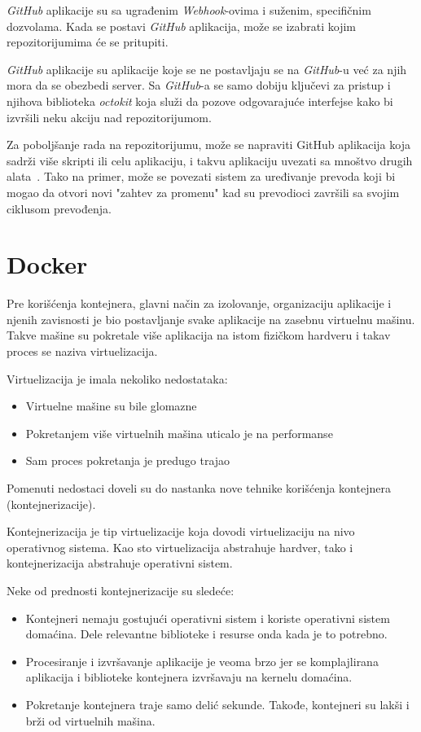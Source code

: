 \textit{GitHub} aplikacije su sa ugrađenim \textit{Webhook}-ovima i suženim, specifičnim dozvolama. 
Kada se postavi \textit{GitHub} aplikacija, može se izabrati kojim repozitorijumima će se pritupiti.

\textit{GitHub} aplikacije su aplikacije koje se ne postavljaju se na \textit{GitHub}-u već za 
njih mora da se obezbedi server. Sa \textit{GitHub}-a se samo dobiju ključevi za pristup i njihova
biblioteka \textit{octokit} koja služi da pozove odgovarajuće interfejse kako bi izvršili neku 
akciju nad repozitorijumom.

Za poboljšanje rada na repozitorijumu, može se napraviti GitHub aplikacija koja sadrži više skripti 
ili celu aplikaciju, i takvu aplikaciju uvezati sa mnoštvo drugih alata~\cite{github_apps}. Tako na 
primer, može se povezati sistem za uređivanje prevoda koji bi mogao da otvori novi "zahtev za promenu"
kad su prevodioci završili sa svojim ciklusom prevođenja.

\section{Docker}\label{sec:docker}

Pre korišćenja kontejnera, glavni način za izolovanje, organizaciju aplikacije i njenih zavisnosti je 
bio postavljanje svake aplikacije na zasebnu virtuelnu mašinu. Takve mašine su pokretale više aplikacija 
na istom fizičkom hardveru i takav proces se naziva virtuelizacija.

Virtuelizacija je imala nekoliko nedostataka: 
\begin{itemize}
    \item Virtuelne mašine su bile glomazne
    \item Pokretanjem više virtuelnih mašina uticalo je na performanse
    \item Sam proces pokretanja je predugo trajao
\end{itemize}

Pomenuti nedostaci doveli su do nastanka nove tehnike korišćenja kontejnera (kontejnerizacije). 

Kontejnerizacija je tip virtuelizacije koja dovodi virtuelizaciju na nivo operativnog 
sistema. Kao sto virtuelizacija abstrahuje hardver, tako i kontejnerizacija abstrahuje 
operativni sistem.

Neke od prednosti kontejnerizacije su sledeće:
\begin{itemize}
    \item Kontejneri nemaju gostujući operativni sistem i koriste operativni sistem domaćina. 
    Dele relevantne biblioteke i resurse onda kada je to potrebno.
    \item Procesiranje i izvršavanje aplikacije je veoma brzo jer se komplajlirana aplikacija 
    i biblioteke kontejnera izvršavaju na kernelu domaćina.
    \item Pokretanje kontejnera traje samo delić sekunde. Takođe, kontejneri su lakši i brži 
    od virtuelnih mašina.
\end{itemize}

